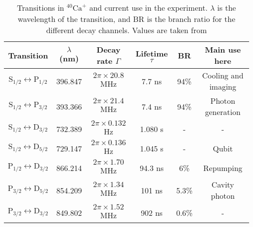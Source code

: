 \begin{table}[H]
\centering
\begin{tabular}{c c c c c c}
 \toprule
    {Transition} & { $\lambda$ (nm)} & {Decay rate $\Gamma$} & Lifetime $\tau$ & BR & {Main use here} \\ \midrule
   $\text{S}_{1/2} \leftrightarrow \text{P}_{1/2}$ & 396.847 & $2\pi \times 20.8$ MHz & 7.7 ns & 94\% &Cooling and imaging \\
    $\text{S}_{1/2} \leftrightarrow \text{P}_{3/2}$  & 393.366 & $2\pi \times 21.4$ MHz & 7.4 ns & 94\% &Photon generation\\ \midrule
   $\text{S}_{1/2} \leftrightarrow \text{D}_{3/2}$ & 732.389 & $2\pi \times 0.132$ Hz & 1.080 s & - & - \\
    $\text{S}_{1/2} \leftrightarrow \text{D}_{5/2}$  & 729.147 & $2\pi \times 0.136$ Hz & 1.045 s & - & Qubit  \\\midrule
    $\text{P}_{1/2} \leftrightarrow \text{D}_{3/2}$  & 866.214 &  $2\pi \times 1.70$ MHz  &  94.3 ns & 6\% & Repumping \\
    $\text{P}_{3/2} \leftrightarrow \text{D}_{5/2}$  & 854.209 & $2\pi \times 1.34$ MHz & 101 ns & 5.3\%  & Cavity photon  \\
    $\text{P}_{3/2} \leftrightarrow \text{D}_{3/2}$  & 849.802 & $2\pi \times 1.52$ MHz  & 902 ns & 0.6\%  & - \\ \bottomrule
\end{tabular}
\caption{Transitions in $^{40}\text{Ca}^+$ and current use in the experiment. $\lambda$ is the wavelength of the transition, and BR is the branch ratio for the different decay channels. Values are taken from \cite{ion_spacing,stute}}
\label{transitiontable}
\end{table}

